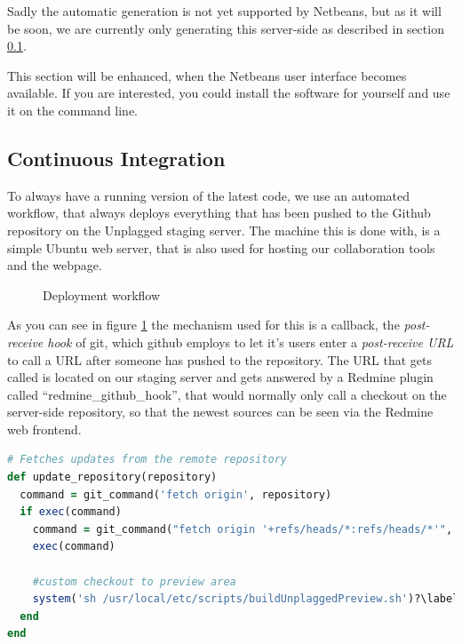 Sadly the automatic generation is not yet supported by Netbeans, but as it will be soon\citep{Heise2012}, we are
currently only generating this server-side as described in section \ref{sec:continuousIntegration}. 

This section will be enhanced, when the Netbeans user interface becomes available. If you are interested, you could 
install the software for yourself and use it on the command line.

\subsection{Continuous Integration}\label{sec:continuousIntegration}

To always have a running version of the latest code, we use an automated workflow, that always deploys everything that 
has been pushed to the Github repository on the Unplagged staging server. The machine this is done with, is a simple 
Ubuntu web server, that is also used for hosting our collaboration tools and the webpage.

\begin{figure}[!h]
  \centering
  \caption{Deployment workflow}
  \label{fig:developmentWorkflow}
\end{figure}

As you can see in figure \ref{fig:developmentWorkflow} the mechanism used for this is a callback, the 
\textit{post-receive hook} of git, 
which github employs to let it's users enter a \textit{post-receive URL} to call a URL after someone has pushed to the
repository. The URL that gets called is located on our staging server and gets answered by a Redmine plugin called 
\enquote{redmine\_github\_hook}, that would
normally only call a checkout on the server-side repository, so that the newest sources can be seen via the Redmine
web frontend. 

\begin{lstlisting}[caption=Changes to redmine\_github\_hook.rb, label=list:redmineGithubHook, language=Ruby]
# Fetches updates from the remote repository
def update_repository(repository)
  command = git_command('fetch origin', repository)
  if exec(command)
    command = git_command("fetch origin '+refs/heads/*:refs/heads/*'", repository)
    exec(command)

    #custom checkout to preview area
    system('sh /usr/local/etc/scripts/buildUnplaggedPreview.sh')?\label{customRubyChange}?
  end
end
\end{lstlisting}


